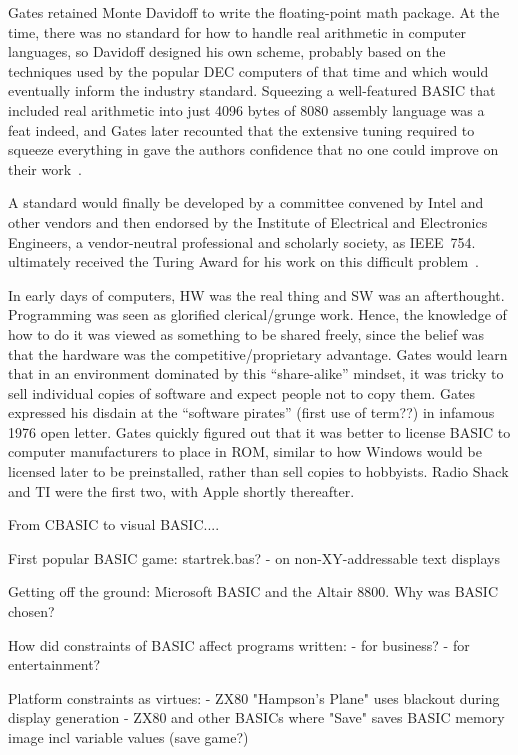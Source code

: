 Gates retained
Monte Davidoff to write the floating-point math package.
At the time, there was no standard for how to handle real arithmetic in
computer languages, so Davidoff designed his own scheme, probably based
on the techniques used by the popular DEC computers of that time and
which would eventually inform the industry standard.
Squeezing a well-featured BASIC that included real arithmetic into just
4096 bytes of 8080 assembly language was a feat indeed, and Gates later
recounted that the extensive tuning required to squeeze everything in
gave the authors confidence that no one could improve on their
work~\cite{programmers_at_work}. 

  \begin{geeknote}
  A standard would finally be developed by a committee convened by Intel
  and other vendors and then endorsed by the Institute of Electrical and
  Electronics Engineers, a vendor-neutral professional and scholarly
  society, as IEEE~754.   ultimately received the
  Turing Award for his work on this difficult problem~\cite{kahan_interview}.
  \end{geeknote}

In early days of computers, HW was the real thing and SW was an
afterthought.  Programming was seen as glorified clerical/grunge work.
Hence, the knowledge of how to do it was viewed as something to be
shared freely, since the belief was that the hardware was the
competitive/proprietary advantage.
Gates would learn that in an environment dominated by this
``share-alike'' mindset, it was
tricky to sell individual copies of software and expect people not to
copy them.  Gates
expressed his disdain at the ``software pirates'' (first use of term??) in infamous
1976 open letter.
Gates quickly figured out that it was better to license BASIC to
computer manufacturers to place in ROM, similar to how Windows would be
licensed later to be preinstalled, rather than sell copies to
hobbyists.  Radio Shack and TI were the first two, with Apple shortly
thereafter.  

From CBASIC to visual BASIC....


First popular BASIC game: startrek.bas?
  - on non-XY-addressable text displays

Getting off the ground: Microsoft BASIC and the Altair 8800.  Why was
    BASIC chosen?


How did constraints of BASIC affect programs written:
- for business?
- for entertainment?



Platform constraints as virtues:
 - ZX80 "Hampson's Plane" uses blackout during display generation 
 - ZX80 and other BASICs where "Save" saves BASIC memory image incl
 variable values (save game?)
